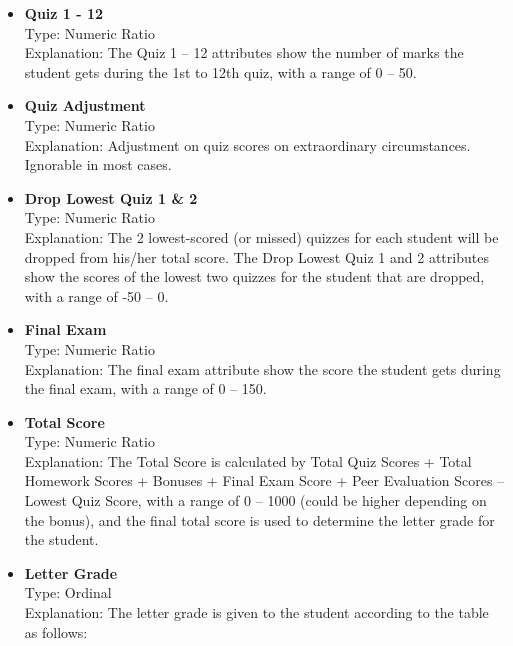 \documentclass{article}
\begin{document}
\begin{itemize}
    \item \textbf{Quiz 1 - 12} \\
    Type: Numeric Ratio \\
    Explanation: The Quiz 1 – 12 attributes show the number of marks the student gets during the 1st to 12th quiz, with a range of 0 – 50.\\
    \item \textbf{Quiz Adjustment} \\
    Type: Numeric Ratio \\
    Explanation: Adjustment on quiz scores on extraordinary circumstances. Ignorable in most cases.\\
    \item \textbf{Drop Lowest Quiz 1 & 2} \\
    Type: Numeric Ratio \\
    Explanation: The 2 lowest-scored (or missed) quizzes for each student will be dropped from his/her total score. The Drop Lowest Quiz 1 and 2 attributes show the scores of the lowest two quizzes for the student that are dropped, with a range of -50 – 0.\\
    \item \textbf{Final Exam} \\
    Type: Numeric Ratio \\
    Explanation: The final exam attribute show the score the student gets during the final exam, with a range of 0 – 150.\\
    \item \textbf{Total Score} \\
    Type: Numeric Ratio \\
    Explanation: The Total Score is calculated by Total Quiz Scores + Total Homework Scores + Bonuses + Final Exam Score + Peer Evaluation Scores – Lowest Quiz Score, with a range of 0 – 1000 (could be higher depending on the bonus), and the final total score is used to determine the letter grade for the student.\\
    \item \textbf{Letter Grade} \\
    Type: Ordinal \\
    Explanation: The letter grade is given to the student according to the table as follows:
\end{itemize}
\end{document}
